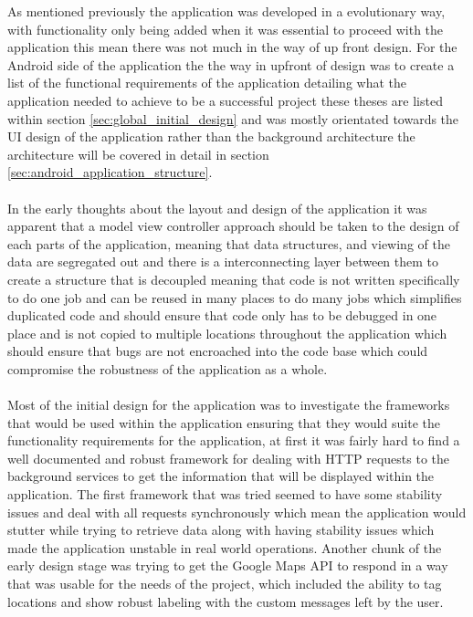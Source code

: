 As mentioned previously the application was developed in a evolutionary way, with functionality only being added when it was essential to proceed with the application this mean there was not much in the way of up front design. For the Android side of the application the the way in upfront of design was to create a list of the functional requirements of the application detailing what the application needed to achieve to be a successful project these theses are listed within section \ref{sec:global_initial_design} and was mostly orientated towards the UI design of the application rather than the background architecture the architecture will be covered in detail in section \ref{sec:android_application_structure}.\\
\\
In the early thoughts about the layout and design of the application it was apparent that a model view controller approach should be taken to the design of each parts of the application, meaning that data structures, and viewing of the data are segregated out and there is a interconnecting layer between them to create a structure that is decoupled meaning that code is not written specifically to do one job and can be reused in many places to do many jobs which simplifies duplicated code and should ensure that code only has to be debugged in one place and is not copied to multiple locations throughout the application which should ensure that bugs are not encroached into the code base which could compromise the robustness of the application as a whole.\\
\\
Most of the initial design for the application was to investigate the frameworks that would be used within the application ensuring that they would suite the functionality requirements for the application, at first it was fairly hard to find a well documented and robust framework for dealing with HTTP requests to the background services to get the information that will be displayed within the application. The first framework that was tried seemed to have some stability issues and deal with all requests synchronously which mean the application would stutter while trying to retrieve data along with having stability issues which made the application unstable in real world operations. Another chunk of the early design stage was trying to get the Google Maps API to respond in a way that was usable for the needs of the project, which included the ability to tag locations and show robust labeling with the custom messages left by the user.

